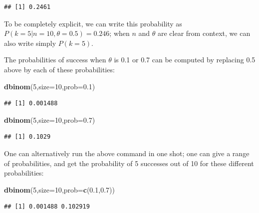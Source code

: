 \documentclass[12pt,]{krantz}
\newenvironment{Shaded}{\begin{snugshade}}{\end{snugshade}}
\newcommand{\DataTypeTok}[1]{\textcolor[rgb]{0.13,0.29,0.53}{#1}}
\newcommand{\DecValTok}[1]{\textcolor[rgb]{0.00,0.00,0.81}{#1}}
\newcommand{\FloatTok}[1]{\textcolor[rgb]{0.00,0.00,0.81}{#1}}
\newcommand{\KeywordTok}[1]{\textcolor[rgb]{0.13,0.29,0.53}{\textbf{#1}}}
\newcommand{\NormalTok}[1]{#1}
\begin{document}
\begin{verbatim}
## [1] 0.2461
\end{verbatim}

To be completely explicit, we can write this probability as \(P(k=5|n=10,\theta=0.5)=0.246\); when \(n\) and \(\theta\) are clear from context, we can also write simply \(P(k=5)\).

The probabilities of success when \(\theta\) is 0.1 or 0.7 can be computed by replacing 0.5 above by each of these probabilities:

\begin{Shaded}
\begin{Highlighting}[]
\KeywordTok{dbinom}\NormalTok{(}\DecValTok{5}\NormalTok{,}\DataTypeTok{size=}\DecValTok{10}\NormalTok{,}\DataTypeTok{prob=}\FloatTok{0.1}\NormalTok{)}
\end{Highlighting}
\end{Shaded}

\begin{verbatim}
## [1] 0.001488
\end{verbatim}

\begin{Shaded}
\begin{Highlighting}[]
\KeywordTok{dbinom}\NormalTok{(}\DecValTok{5}\NormalTok{,}\DataTypeTok{size=}\DecValTok{10}\NormalTok{,}\DataTypeTok{prob=}\FloatTok{0.7}\NormalTok{)}
\end{Highlighting}
\end{Shaded}

\begin{verbatim}
## [1] 0.1029
\end{verbatim}

One can alternatively run the above command in one shot; one can give a range of probabilities, and get the probability of 5 successes out of 10 for these different probabilities:

\begin{Shaded}
\begin{Highlighting}[]
\KeywordTok{dbinom}\NormalTok{(}\DecValTok{5}\NormalTok{,}\DataTypeTok{size=}\DecValTok{10}\NormalTok{,}\DataTypeTok{prob=}\KeywordTok{c}\NormalTok{(}\FloatTok{0.1}\NormalTok{,}\FloatTok{0.7}\NormalTok{))}
\end{Highlighting}
\end{Shaded}

\begin{verbatim}
## [1] 0.001488 0.102919
\end{verbatim}
\end{document}
